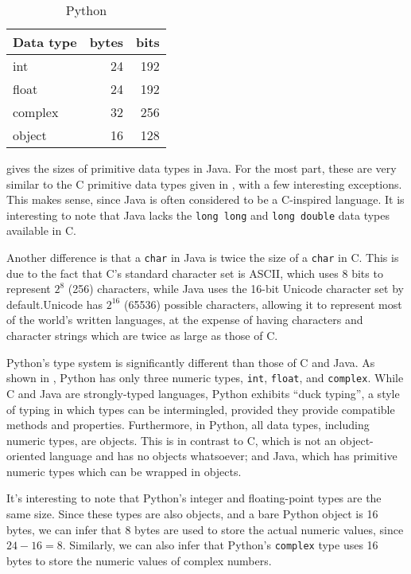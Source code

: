 \documentclass[12pt,letterpaper]{article}
\begin{document}
\begin{table}[H]
\begin{subtable}[t]{.33\linewidth}
		      \centering
		        \caption{Python}
		        \label{table:pri-py}
					\begin{tabular}{l r r}
						\toprule
						Data type & bytes & bits\\
						\midrule
						int          &     24 &    192 \\
						float        &     24 &    192 \\
						complex      &     32 &    256 \\
						object       &     16 &    128 \\
						  \bottomrule
		        \end{tabular}
		    \end{subtable} 
		\end{table}

		 gives the sizes of primitive data types in Java. For the most part, these are very similar to the C primitive data types given in , with a few interesting exceptions. This makes sense, since Java is often considered to be a C-inspired language. It is interesting to note that Java lacks the \texttt{long long} and \texttt{long double} data types available in C. 

		Another difference is that a \texttt{char} in Java is twice the size of a \texttt{char} in C. This is due to the fact that C's standard character set is ASCII, which uses 8 bits to represent $2^8$ (256) characters, while Java uses the 16-bit Unicode character set by default.Unicode has $2^16$ (65536) possible characters, allowing it to represent most of the world's written languages, at the expense of having characters and character strings which are twice as large as those of C.

		Python's type system is significantly different than those of C and Java. As shown in , Python has only three numeric types, \texttt{int}, \texttt{float}, and \texttt{complex}. While C and Java are strongly-typed languages, Python exhibits ``duck typing'', a style of typing in which types can be intermingled, provided they provide compatible methods and properties. Furthermore, in Python, all data types, including numeric types, are objects. This is in contrast to C, which is not an object-oriented language and has no objects whatsoever; and Java, which has primitive numeric types which can be wrapped in objects. 

		It's interesting to note that Python's integer and floating-point types are the same size. Since these types are also objects, and a bare Python object is 16 bytes, we can infer that 8 bytes are used to store the actual numeric values, since $24 - 16 = 8$. Similarly, we can also infer that Python's \texttt{complex} type uses 16 bytes to store the numeric values of complex numbers. 
\end{document}
